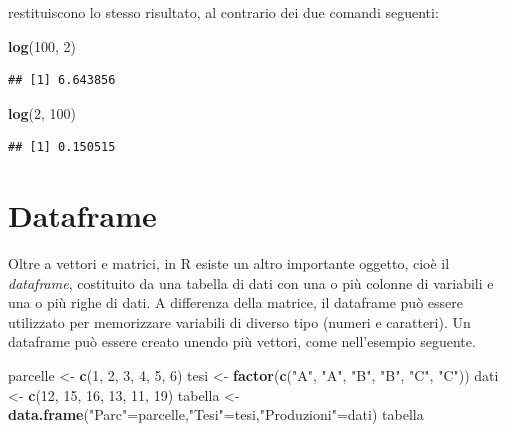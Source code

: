 \documentclass[a4paper,12pt,oneside]{book}
\newenvironment{Shaded}{\begin{snugshade}}{\end{snugshade}}
\newcommand{\KeywordTok}[1]{\textcolor[rgb]{0.13,0.29,0.53}{\textbf{#1}}}
\newcommand{\DecValTok}[1]{\textcolor[rgb]{0.00,0.00,0.81}{#1}}
\newcommand{\StringTok}[1]{\textcolor[rgb]{0.31,0.60,0.02}{#1}}
\newcommand{\NormalTok}[1]{#1}
\begin{document}
restituiscono lo stesso risultato, al contrario dei due comandi
seguenti:

\begin{Shaded}
\begin{Highlighting}[]
\KeywordTok{log}\NormalTok{(}\DecValTok{100}\NormalTok{, }\DecValTok{2}\NormalTok{)}
\end{Highlighting}
\end{Shaded}

\begin{verbatim}
## [1] 6.643856
\end{verbatim}

\begin{Shaded}
\begin{Highlighting}[]
\KeywordTok{log}\NormalTok{(}\DecValTok{2}\NormalTok{, }\DecValTok{100}\NormalTok{)}
\end{Highlighting}
\end{Shaded}

\begin{verbatim}
## [1] 0.150515
\end{verbatim}

\section{Dataframe}\label{dataframe}

Oltre a vettori e matrici, in R esiste un altro importante oggetto, cioè
il \emph{dataframe}, costituito da una tabella di dati con una o più
colonne di variabili e una o più righe di dati. A differenza della
matrice, il dataframe può essere utilizzato per memorizzare variabili di
diverso tipo (numeri e caratteri). Un dataframe può essere creato unendo
più vettori, come nell'esempio seguente.

\begin{Shaded}
\begin{Highlighting}[]
\NormalTok{parcelle  <-}\StringTok{  }\KeywordTok{c}\NormalTok{(}\DecValTok{1}\NormalTok{, }\DecValTok{2}\NormalTok{, }\DecValTok{3}\NormalTok{, }\DecValTok{4}\NormalTok{, }\DecValTok{5}\NormalTok{, }\DecValTok{6}\NormalTok{)}
\NormalTok{tesi  <-}\StringTok{  }\KeywordTok{factor}\NormalTok{(}\KeywordTok{c}\NormalTok{(}\StringTok{"A"}\NormalTok{, }\StringTok{"A"}\NormalTok{, }\StringTok{"B"}\NormalTok{, }\StringTok{"B"}\NormalTok{, }\StringTok{"C"}\NormalTok{, }\StringTok{"C"}\NormalTok{))}
\NormalTok{dati  <-}\StringTok{  }\KeywordTok{c}\NormalTok{(}\DecValTok{12}\NormalTok{, }\DecValTok{15}\NormalTok{, }\DecValTok{16}\NormalTok{, }\DecValTok{13}\NormalTok{, }\DecValTok{11}\NormalTok{, }\DecValTok{19}\NormalTok{)}
\NormalTok{tabella  <-}\StringTok{  }\KeywordTok{data.frame}\NormalTok{(}\StringTok{"Parc"}\NormalTok{=parcelle,}\StringTok{"Tesi"}\NormalTok{=tesi,}\StringTok{"Produzioni"}\NormalTok{=dati)}
\NormalTok{tabella}
\end{Highlighting}
\end{Shaded}
\end{document}
